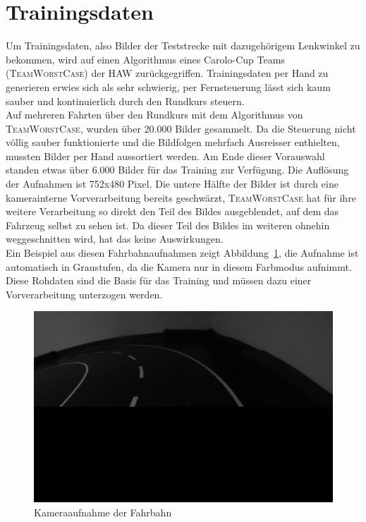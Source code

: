 \section{Trainingsdaten}

Um Trainingsdaten, also Bilder der Teststrecke mit dazugehörigem Lenkwinkel zu bekommen, wird auf einen Algorithmus eines Carolo-Cup Teams (\textsc{TeamWorstCase}) der HAW zurückgegriffen. Trainingsdaten per Hand zu generieren erwies sich als sehr schwierig, per Fernsteuerung lässt sich kaum sauber und kontinuierlich durch den Rundkurs steuern.\\
Auf mehreren Fahrten über den Rundkurs mit dem Algorithmus von \textsc{TeamWorstCase}, wurden über 20.000 Bilder gesammelt. Da die Steuerung nicht völlig sauber funktionierte und die Bildfolgen mehrfach Ausreisser enthielten, mussten Bilder per Hand aussortiert werden. Am Ende dieser Vorauswahl standen etwas über 6.000 Bilder für das Training zur Verfügung. Die Auflösung der Aufnahmen ist 752x480 Pixel. Die untere Hälfte der Bilder ist durch eine kamerainterne Vorverarbeitung bereits geschwärzt, \textsc{TeamWorstCase} hat für ihre weitere Verarbeitung so direkt den Teil des Bildes ausgeblendet, auf dem das Fahrzeug selbst zu sehen ist. Da dieser Teil des Bildes im weiteren ohnehin weggeschnitten wird, hat das keine Auswirkungen. \\
Ein Beispiel aus diesen Fahrbahnaufnahmen zeigt Abbildung~\ref{img:rohbild}, die Aufnahme ist automatisch in Graustufen, da die Kamera nur in diesem Farbmodus aufnimmt.
Diese Rohdaten sind die Basis für das Training und müssen dazu einer Vorverarbeitung unterzogen werden. 

\begin{figure}[h]
	\centering
	\includegraphics[scale=0.4]{figures/Rohbild.png}
	\caption{Kameraaufnahme der Fahrbahn}
	\label{img:rohbild}
\end{figure}


